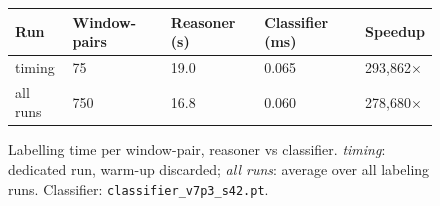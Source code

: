 \begin{figure}[t]
\centering
\begin{tabular}{lllll}
\toprule
Run & Window-pairs & Reasoner (s) & Classifier (ms) & Speedup \\
\midrule
timing & 75 & 19.0 & 0.065 & 293,862$\times$ \\
all runs & 750 & 16.8 & 0.060 & 278,680$\times$ \\
\bottomrule
\end{tabular}
\caption{\small{Labelling time per window-pair, reasoner vs classifier. \emph{timing}: dedicated run, warm-up discarded; \emph{all runs}: average over all labeling runs. Classifier: \texttt{classifier\_v7p3\_s42.pt}.}}
\label{fig:speedup-pub}
\end{figure}
